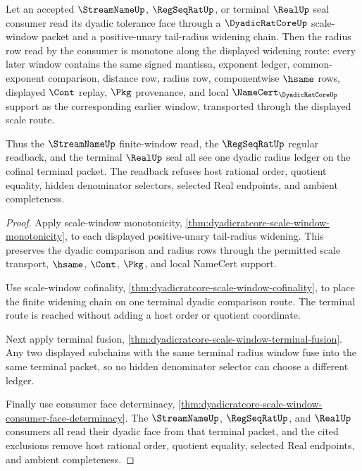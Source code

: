 \begin{theorem}
\label{thm:dyadicratcore-tail-radius-monotone-readback}
Let an accepted $\StreamNameUp$, $\RegSeqRatUp$, or terminal $\RealUp$ seal consumer read its dyadic tolerance face through a $\DyadicRatCoreUp$ scale-window packet and a positive-unary tail-radius widening chain. Then the radius row read by the consumer is monotone along the displayed widening route: every later window contains the same signed mantissa, exponent ledger, common-exponent comparison, distance row, radius row, componentwise $\hsame$ rows, displayed $\Cont$ replay, $\Pkg$ provenance, and local $\NameCert_{\DyadicRatCoreUp}$ support as the corresponding earlier window, transported through the displayed scale route.

Thus the $\StreamNameUp$ finite-window read, the $\RegSeqRatUp$ regular readback, and the terminal $\RealUp$ seal all see one dyadic radius ledger on the cofinal terminal packet. The readback refuses host rational order, quotient equality, hidden denominator selectors, selected Real endpoints, and ambient completeness.
\end{theorem}
\begin{proof}
Apply scale-window monotonicity, \autoref{thm:dyadicratcore-scale-window-monotonicity}, to each displayed positive-unary tail-radius widening. This preserves the dyadic comparison and radius rows through the permitted scale transport, $\hsame$, $\Cont$, $\Pkg$, and local NameCert support.

Use scale-window cofinality, \autoref{thm:dyadicratcore-scale-window-cofinality}, to place the finite widening chain on one terminal dyadic comparison route. The terminal route is reached without adding a host order or quotient coordinate.

Next apply terminal fusion, \autoref{thm:dyadicratcore-scale-window-terminal-fusion}. Any two displayed subchains with the same terminal radius window fuse into the same terminal packet, so no hidden denominator selector can choose a different ledger.

Finally use consumer face determinacy, \autoref{thm:dyadicratcore-scale-window-consumer-face-determinacy}. The $\StreamNameUp$, $\RegSeqRatUp$, and $\RealUp$ consumers all read their dyadic face from that terminal packet, and the cited exclusions remove host rational order, quotient equality, selected Real endpoints, and ambient completeness.
\end{proof}

